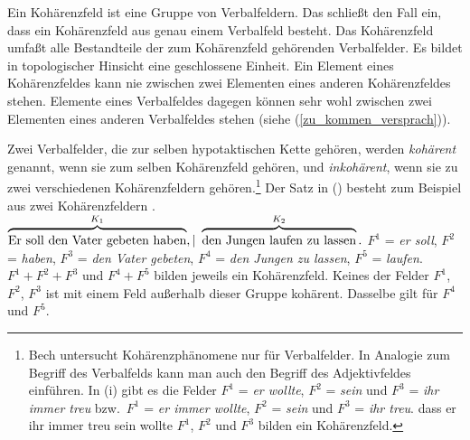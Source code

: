 Ein Kohärenzfeld ist eine Gruppe von Verbalfeldern. Das schließt den Fall ein,
dass ein Kohärenzfeld aus genau einem Verbalfeld besteht. Das Kohärenzfeld umfaßt alle Bestandteile der
zum Kohärenzfeld gehörenden Verbalfelder. Es bildet in topologischer
Hinsicht eine geschlossene Einheit. Ein Element eines Kohärenzfeldes kann nie zwischen
zwei Elementen eines anderen Kohärenzfeldes stehen. Elemente eines Verbalfeldes dagegen
können sehr wohl zwischen zwei Elementen eines anderen Verbalfeldes stehen (siehe (\ref{zu_kommen_versprach})).

Zwei Verbalfelder, die zur selben hypotaktischen Kette gehören, werden \emph{kohärent} genannt,%
wenn sie zum selben Kohärenzfeld gehören, und \emph{inkohärent},%
wenn sie zu zwei verschiedenen Kohärenzfeldern gehören.\footnote{
        Bech untersucht Kohärenzphänomene nur für Verbalfelder.
        In Analogie zum Begriff des Verbalfelds kann man
        auch den Begriff des Adjektivfeldes
        einführen.
        In (i) gibt es die Felder $F^1$ = \emph{er wollte}, $F^2$ = \emph{sein} und
        $F^3$ = \emph{ihr immer treu} bzw.\ $F^1$ = \emph{er immer wollte}, $F^2$ = \emph{sein} und
        $F^3$ = \emph{ihr treu}.
        \ea
        dass er ihr immer treu sein wollte
        \z
        $F^1$, $F^2$ und $F^3$ bilden ein Kohärenzfeld.
}
Der Satz in () besteht zum Beispiel aus zwei Kohärenzfeldern \citep[\S 58]{Bech55a}.
\ea
${\overbrace{\rule{0cm}{2ex}{\textrm{Er~soll~den~Vater~gebeten~haben}}
                 }^{K_1},|~ 
      \overbrace{\rule{0cm}{2ex}{\textrm{den~Jungen~laufen~zu~lassen}}
                }^{K_2}.}$
\z
$F^1$ = \emph{er soll}, $F^2$ = \emph{haben}, $F^3$ = \emph{den Vater gebeten},
$F^4$ = \emph{den Jungen zu lassen}, $F^5$ = \emph{laufen}. $F^1 + F^2 + F^3$ und $F^4 + F^5$
bilden jeweils ein Kohärenzfeld. Keines der Felder $F^1$, $F^2$, $F^3$ ist mit einem Feld
außerhalb dieser Gruppe kohärent. Dasselbe gilt für $F^4$ und $F^5$.

